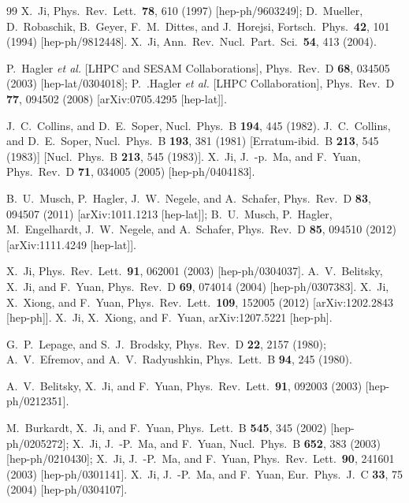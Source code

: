 \begin{thebibliography}{99}
  X.~Ji,
  Phys.\ Rev.\ Lett.\  {\bf 78}, 610 (1997)
  [hep-ph/9603249];
  D.~Mueller, D.~Robaschik, B.~Geyer, F.~M.~Dittes, and J.~Horejsi,
  Fortsch.\ Phys.\  {\bf 42}, 101 (1994)
  [hep-ph/9812448].
  X.~Ji,
  Ann.\ Rev.\ Nucl.\ Part.\ Sci.\  {\bf 54}, 413 (2004).

  P.~Hagler {\it et al.}  [LHPC and SESAM Collaborations],
  Phys.\ Rev.\ D {\bf 68}, 034505 (2003)
  [hep-lat/0304018];
  P.~.Hagler {\it et al.}  [LHPC Collaboration],
  Phys.\ Rev.\ D {\bf 77}, 094502 (2008)
  [arXiv:0705.4295 [hep-lat]].

  J.~C.~Collins, and D.~E.~Soper,
  Nucl.\ Phys.\ B {\bf 194}, 445 (1982).
  J.~C.~Collins, and D.~E.~Soper,
  Nucl.\ Phys.\ B {\bf 193}, 381 (1981)
  [Erratum-ibid.\ B {\bf 213}, 545 (1983)]
  [Nucl.\ Phys.\ B {\bf 213}, 545 (1983)].
  X.~Ji, J.~-p.~Ma, and F.~Yuan,
  Phys.\ Rev.\ D {\bf 71}, 034005 (2005)
  [hep-ph/0404183].


  B.~U.~Musch, P.~Hagler, J.~W.~Negele, and A.~Schafer,
  Phys.\ Rev.\ D {\bf 83}, 094507 (2011)
  [arXiv:1011.1213 [hep-lat]];
  B.~U.~Musch, P.~Hagler, M.~Engelhardt, J.~W.~Negele, and A.~Schafer,
  Phys.\ Rev.\ D {\bf 85}, 094510 (2012)
  [arXiv:1111.4249 [hep-lat]].

  X.~Ji,
  Phys.\ Rev.\ Lett.\  {\bf 91}, 062001 (2003)
  [hep-ph/0304037].
  A.~V.~Belitsky, X.~Ji, and F.~Yuan,
  Phys.\ Rev.\ D {\bf 69}, 074014 (2004)
  [hep-ph/0307383].
  X.~Ji, X.~Xiong, and F.~Yuan,
  Phys.\ Rev.\ Lett.\  {\bf 109}, 152005 (2012)
  [arXiv:1202.2843 [hep-ph]].
  X.~Ji, X.~Xiong, and F.~Yuan,
  arXiv:1207.5221 [hep-ph].

  G.~P.~Lepage, and S.~J.~Brodsky,
  Phys.\ Rev.\ D {\bf 22}, 2157 (1980);
  A.~V.~Efremov, and A.~V.~Radyushkin,
  Phys.\ Lett.\ B {\bf 94}, 245 (1980).

  A.~V.~Belitsky, X.~Ji, and F.~Yuan,
  Phys.\ Rev.\ Lett.\  {\bf 91}, 092003 (2003)
  [hep-ph/0212351].

  M.~Burkardt, X.~Ji, and F.~Yuan,
  Phys.\ Lett.\ B {\bf 545}, 345 (2002)
  [hep-ph/0205272];
  X.~Ji, J.~-P.~Ma, and F.~Yuan,
  Nucl.\ Phys.\ B {\bf 652}, 383 (2003)
  [hep-ph/0210430];
  X.~Ji, J.~-P.~Ma, and F.~Yuan,
  Phys.\ Rev.\ Lett.\  {\bf 90}, 241601 (2003)
  [hep-ph/0301141].
  X.~Ji, J.~-P.~Ma, and F.~Yuan,
  Eur.\ Phys.\ J.\ C {\bf 33}, 75 (2004)
  [hep-ph/0304107].


\end{thebibliography}
